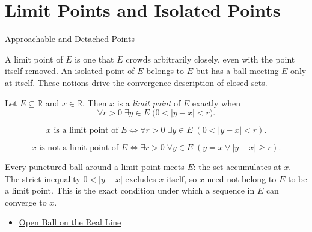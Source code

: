 \section{Limit Points and Isolated Points}
\label{sec:limit-and-isolated-points}

\begin{topicbox}{Approachable and Detached Points}
\begin{exposition}
A limit point of $E$ is one that $E$ crowds arbitrarily closely, even with the point itself removed. An isolated point of $E$ belongs to $E$ but has a ball meeting $E$ only at itself. These notions drive the convergence description of closed sets.
\end{exposition}
\end{topicbox}
\begin{tcolorbox}[colback=defbox, colframe=defborder, arc=2pt,
  left=6pt, right=6pt, top=4pt, bottom=4pt,
  title={\small\textbf{Definition (Limit Point)}},
  fonttitle=\small\bfseries]
\begin{definition}
\label{def:limit-point}
Let $E\subseteq\mathbb{R}$ and $x\in\mathbb{R}$. Then $x$ is a \emph{limit point} of $E$ exactly when
\[
\forall r>0\;\exists y\in E\;\bigl(0<|y-x|<r\bigr).
\]
\end{definition}
\end{tcolorbox}
\begin{remark*}
\[
x \text{ is a limit point of } E \Longleftrightarrow \forall r>0\;\exists y\in E\;(0<|y-x|<r).
\]
\end{remark*}
\begin{remark*}
\[
x \text{ is not a limit point of } E \Longleftrightarrow \exists r>0\;\forall y\in E\;(y=x \lor |y-x|\ge r).
\]
\end{remark*}
\begin{remark*}[Interpretation]
Every punctured ball around a limit point meets $E$: the set accumulates at $x$. The strict inequality $0<|y-x|$ excludes $x$ itself, so $x$ need not belong to $E$ to be a limit point. This is the exact condition under which a sequence in $E$ can converge to $x$.
\end{remark*}
\begin{dependencies}
\begin{itemize}
  \item \hyperref[def:open-ball]{Open Ball on the Real Line}
\end{itemize}
\end{dependencies}
